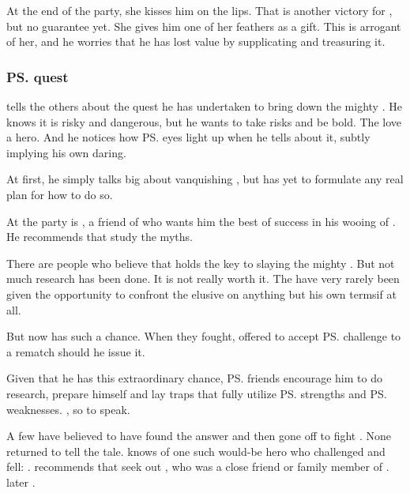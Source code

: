 At the end of the party, she kisses him on the lips. 
That is another victory for \Teshrial, but no guarantee yet. 
She gives him one of her feathers as a gift. 
This is arrogant of her, and he worries that he has lost value by supplicating and treasuring it. 





\subsubsection{\ps{\Teshrial} quest}
\Teshrial{} tells the others about the quest he has undertaken to bring down the mighty \Ishnaruchaefir. 
He knows it is risky and dangerous, but he wants to take risks and be bold. 
The \resviel{} love a hero. 
And he notices how \ps{\Firaxel} eyes light up when he tells about it, subtly implying his own daring. 

At first, he simply talks big about vanquishing \Ishnaruchaefir, but has yet to formulate any real plan for how to do so. 

At the party is , a friend of \Teshrial{} who wants him the best of success in his wooing of \Firaxel. 
He recommends that \Teshrial{} study the myths. 

There are people who believe that \WanderersInDarknessEmph holds the key to slaying the mighty \dragonlord. 
But not much research has been done. 
It is not really worth it. 
The have \resphain{} very rarely been given the opportunity to confront the elusive \Ishnaruchaefir{} on anything but his own terms\dash if at all. 

But \Teshrial{} now has such a chance. 
When they fought, \Ishnaruchaefir{} {offered to accept \ps{\Teshrial} challenge to a rematch} should he issue it. 

Given that he has this extraordinary chance, \ps{\Teshrial} friends encourage him to do research, prepare himself and lay traps that fully utilize \ps{\Teshrial} strengths and \ps{\Ishnaruchaefir} weaknesses. 
, so to speak. 

A few have believed to have found the answer and then gone off to fight \Ishnaruchaefir{}. 
None returned to tell the tale. 
\Menessiaraid{} knows of one such would-be hero who challenged \Ishnaruchaefir{} and fell: 
. 
\Menessiaraid{} recommends that \Teshrial{} seek out , who was a close friend or family member of \Lothagiel. 
\Teshrial{} later . 





